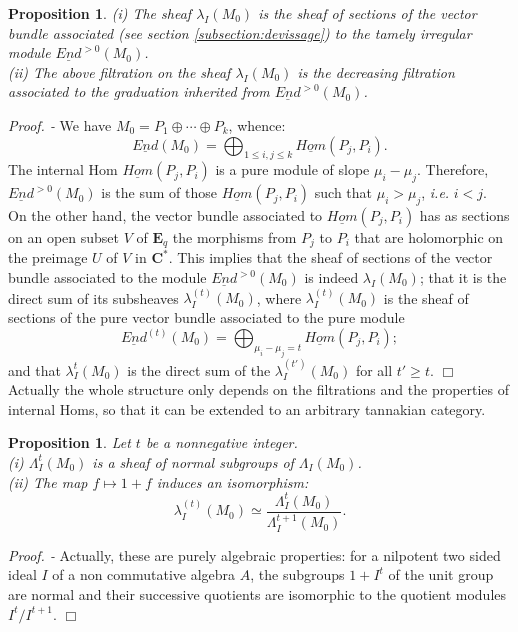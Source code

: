 \documentclass[english]{smfart}
\newtheorem{prop}[thm]{Proposition}
\numberwithin{equation}{thm}
\def \Pr {\textsl{Proof. - }}
\def\C{{\mathbf C}}
\def\Eq{{\mathbf{E}_{q}}}
\def\la{\lambda}
\def\La{\Lambda}
\begin{document}
\begin{prop} \label{prop:Lie=bundle} 
(i) The sheaf $\la_{I}(M_{0})$ is the sheaf of sections of the vector
bundle associated (see section \ref{subsection:devissage})
to the tamely irregular module $\underline{End}^{> 0}(M_{0})$. \\
(ii) The above filtration on the sheaf $\la_{I}(M_{0})$ is the
decreasing filtration associated to the graduation inherited from
$\underline{End}^{> 0}(M_{0})$.
\end{prop}

\Pr
We have $M_{0} = P_{1} \oplus \cdots \oplus P_{k}$, whence:
$$
\underline{End}(M_{0}) = 
\bigoplus_{1 \leq i,j \leq k} \underline{Hom}(P_{j},P_{i}).
$$
The internal Hom $\underline{Hom}(P_{j},P_{i})$ is a pure module of
slope $\mu_{i} - \mu_{j}$. Therefore, $\underline{End}^{> 0}(M_{0})$
is the sum of those $\underline{Hom}(P_{j},P_{i})$ such that
$\mu_{i} > \mu_{j}$, \emph{i.e.} $i < j$. \\

On the other hand, the vector bundle associated to 
$\underline{Hom}(P_{j},P_{i})$ has as sections on an open subset 
$V$ of $\Eq$ the morphisms from $P_{j}$ to $P_{i}$ that are holomorphic
on the preimage $U$ of $V$ in $\C^{*}$. This implies that the sheaf
of sections of the vector bundle associated to the module
$\underline{End}^{> 0}(M_{0})$ is indeed $\la_{I}(M_{0})$;
that it is the direct sum of its subsheaves $\la_{I}^{(t)}(M_{0})$, 
where  $\la_{I}^{(t)}(M_{0})$ is the sheaf of sections of the pure
vector bundle associated to the pure module
$$
\underline{End}^{(t)}(M_{0}) = 
\bigoplus_{\mu_{i} - \mu_{j} = t} \underline{Hom}(P_{j},P_{i});
$$
and that $\la_{I}^{t}(M_{0})$ is the direct sum of the
$\la_{I}^{(t')}(M_{0})$ for all $t' \geq t$.
\hfill $\Box$ \\

Actually the whole structure only depends on the filtrations
and the properties of internal Homs, so that it can be extended
to an arbitrary tannakian category.

\begin{prop}
Let $t$ be a nonnegative integer. \\
(i) $\La_{I}^{t}(M_{0})$ is a sheaf of normal subgroups 
of $\La_{I}(M_{0})$. \\
(ii) The map $f \mapsto 1 + f$ induces an isomorphism: 
$$
\lambda_{I}^{(t)}(M_{0}) \simeq 
\frac{\La_{I}^{t}(M_{0})}{\La_{I}^{t+1}(M_{0})}.
$$
\end{prop}

\Pr
Actually, these are purely algebraic properties: for a nilpotent 
two sided ideal $I$ of a non commutative algebra $A$, the subgroups
$1 + I^{t}$ of the unit group are normal and their successive
quotients are isomorphic to the quotient modules $I^{t}/I^{t+1}$.
\hfill $\Box$ \\
\end{document}
